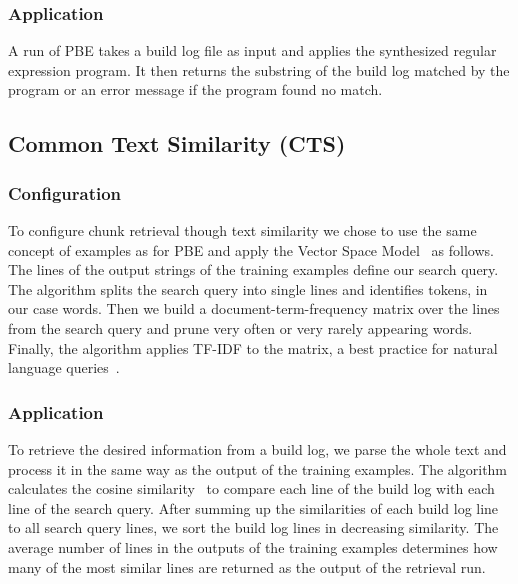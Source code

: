 \subsubsection{Application}
A run of PBE takes a build log file as input and applies the
synthesized regular expression program. It then returns the substring
of the build log matched by the program or an error message if the
program found no match.


\subsection{Common Text Similarity (CTS)}
\label{sec:expl-ts}

\subsubsection{Configuration}
To configure chunk retrieval though text similarity we chose to use
the same concept of examples as for PBE
and apply the Vector Space Model~\cite{schutze2008introduction} as follows. The
lines of the output strings of the training examples define our search
query. The algorithm splits the search query into single lines and
identifies tokens, in our case words. Then we build a
document-term-frequency matrix over the lines from the search query
and prune very often or very rarely appearing words. Finally, the
algorithm applies TF-IDF to the matrix, a best practice for natural
language queries~\cite{lee1997document}.

\subsubsection{Application}
To retrieve the desired information from a build log, we parse the
whole text and process it in the same way as the output of the
training examples. The algorithm calculates the cosine
similarity~\cite{korenius2007principal} to compare each line of the
build log with each line of the search query. After summing up the
similarities of each build log line to all search query lines, we sort
the build log lines in decreasing similarity. The average number of
lines in the outputs of the training examples determines how many of
the most similar lines are returned as the output of the retrieval
run.

